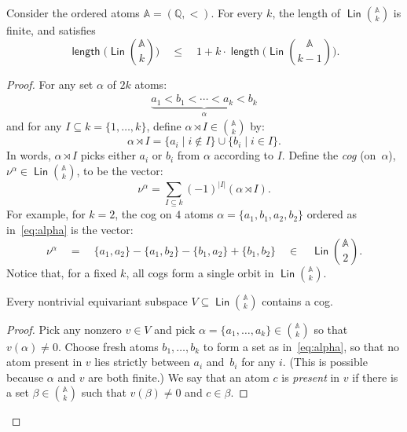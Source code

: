 \documentclass{theoretics}
\newcommand{\Rat}{{\mathbb Q}}
\newcommand{\atoms}{\mathbb A}
\DeclareMathOperator{\lin}{\mathsf{Lin}}
\DeclareMathOperator{\length}{\mathsf{length}}
\begin{document}
\begin{lemma}\label{lem:ordered-length-1o}
Consider the ordered atoms $\atoms=(\Rat,<)$. For every $k$, the length of $\lin{\atoms\choose k}$ is finite, and satisfies
\[
	\textstyle \length\big(\lin{\atoms\choose k}\big)
	\quad \leq \quad  1+k\cdot\length\big(\lin{\atoms\choose k-1}\big).
\] 
\end{lemma}
\begin{proof}
For any set $\alpha$ of $2k$ atoms:
\begin{align}\label{eq:alpha}
	\underbrace{a_1<b_1<\cdots<a_k<b_k}_\alpha
\end{align}
and for any $I\subseteq k = \{1,\ldots,k\}$, define $\alpha\rtimes I \in {\atoms\choose k}$ by:
\[
	\alpha\rtimes I = \{a_i \mid i\not\in I\}\cup \{b_i\mid i\in I\}.
\]
In words, $\alpha\rtimes I$ picks either $a_i$ or $b_i$ from $\alpha$ according to $I$.
Define the {\em cog} (on~$\alpha$), $\nu^\alpha\in \lin {\atoms\choose k}$, to be the vector:
\[
	\nu^\alpha = \sum_{I\subseteq k}(-1)^{|I|}(\alpha\rtimes I).
\]
For example, for $k=2$, the cog on $4$ atoms $\alpha=\{a_1,b_1,a_2,b_2\}$ ordered as in~\eqref{eq:alpha} is the vector:
\[
	\textstyle \nu^\alpha \quad=\quad \{a_1,a_2\}-\{a_1,b_2\}-\{b_1,a_2\}+\{b_1,b_2\} \quad\in\quad \lin{\atoms\choose 2}.
\]
Notice that, for a fixed $k$, all cogs form a single orbit in $\lin{\atoms\choose k}$.

\begin{claim}\label{clm:cogs-everywhere}
Every nontrivial equivariant subspace $V\subseteq \lin{\atoms\choose k}$ contains a cog.
\end{claim}
\begin{proof}
Pick any nonzero $v\in V$ and pick $\alpha=\{a_1,\ldots,a_k\}\in{\atoms\choose k}$ so that $v(\alpha)\neq 0$. Choose fresh atoms $b_1,\ldots,b_k$  to form a set as in~\eqref{eq:alpha}, so that no atom present in $v$ lies strictly between $a_i$ and~$b_i$ for any $i$. (This is possible because $\alpha$ and $v$ are both finite.) We say that an atom $c$ is {\em present} in $v$ if there is a set $\beta\in{\atoms\choose k}$ such that $v(\beta)\neq 0$ and $c\in\beta$.


\end{proof}
\end{proof}
\end{document}
